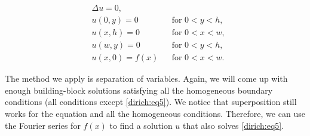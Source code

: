 
\begin{center}
\begin{minipage}[b]{2.8in}
\vspace{\fill}
\begin{align}
& \Delta u = 0 , & &  \label{dirich:eq1} \\
& u(0,y) = 0 & & \text{for }  0 < y < h,\label{dirich:eq2} \\
& u(x,h) = 0 & & \text{for }  0 < x < w,\label{dirich:eq3} \\
& u(w,y) = 0 & & \text{for }  0 < y < h,\label{dirich:eq4} \\
& u(x,0) = f(x) & & \text{for }  0 < x < w.\label{dirich:eq5}
\end{align}
\vspace{\fill}
\end{minipage}
\qquad
\qquad
\end{center}

The method we apply is separation of variables.  Again, we will
come up with enough building-block
solutions satisfying all the homogeneous boundary conditions
(all conditions except \eqref{dirich:eq5}).  We notice that superposition
still works for the equation and all the homogeneous conditions.
Therefore,
we can use the Fourier series for $f(x)$ to find
a solution $u$ that also solves \eqref{dirich:eq5}.

